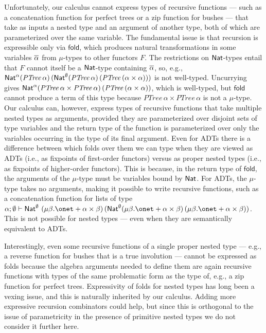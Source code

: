\documentclass{lmcs}
\theoremstyle{plain}\newtheorem{satz}[thm]{Satz}
\newcommand{\fold}{\mathsf{fold}}
\begin{document}
Unfortunately, our calculus cannot express types of recursive
functions --- such as a concatenation function for perfect trees or a
zip function for bushes --- that take as inputs a nested type and an
argument of another type, both of which are parameterized over the
same variable. The fundamental issue is that recursion is expressible
only via $\fold$, which produces natural transformations in some
variables $\overline{\alpha}$ from $\mu$-types to other functors $F$. The
restrictions on $\mathsf{Nat}$-types entail that $F$ cannot itself be a
$\mathsf{Nat}$-type containing $\overline{\alpha}$, so, e.g., $\mathsf{Nat}^\alpha
(\mathit{PTree}\,\alpha) \,(\mathsf{Nat}^\emptyset (\mathit{PTree}\,\alpha)\,
(\mathit{PTree}\,(\alpha \times \alpha)))$ is not well-typed.
Uncurrying gives $\mathsf{Nat}^\alpha (\mathit{PTree}\,\alpha \times
\mathit{PTree}\,\alpha)\, (\mathit{PTree}\,(\alpha \times \alpha))$,
which is well-typed, but $\mathsf{fold}$ cannot produce a term of this
type because $\mathit{PTree}\,\alpha \times \mathit{PTree}\,\alpha$ is
not a $\mu$-type. Our calculus can, however, express types of
recursive functions that take multiple nested types as arguments,
provided they are parameterized over disjoint sets of type variables
and the return type of the function is parameterized over only the
variables occurring in the type of its final argument. Even for ADTs
there is a difference between which folds over them we can type when
they are viewed as ADTs (i.e., as fixpoints of first-order functors)
versus as proper nested types (i.e., as fixpoints of higher-order
functors). This is because, in the return type of $\mathsf{fold}$, the
arguments of the $\mu$-type must be variables bound by $\mathsf{Nat}$.  For
ADTs, the $\mu$-type takes no arguments, making it possible to write
recursive functions, such as a concatenation function for lists of
type $\alpha ; \emptyset \vdash \Nat^\emptyset \ (\mu \beta. \onet +
\alpha \times \beta)\, (\Nat^\emptyset (\mu \beta. \onet + \alpha
\times \beta) \, (\mu \beta. \onet + \alpha \times \beta))$.  This is
not possible for nested types --- even when they are semantically
equivalent to ADTs.

Interestingly, even some recursive functions of a single proper nested
type --- e.g., a reverse function for bushes that is a true involution
--- cannot be expressed as folds because the algebra arguments needed
to define them are again recursive functions with types of the same
problematic form as the type of, e.g., a zip function for perfect
trees.  Expressivity of folds for nested types has long been a vexing
issue, and this is naturally inherited by our calculus. Adding more
expressive recursion combinators could help, but since this is
orthogonal to the issue of parametricity in the presence of primitive
nested types we do not consider it further here.
\end{document}
